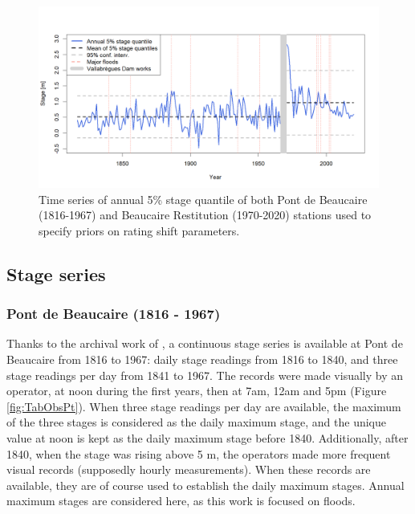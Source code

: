\documentclass[11pt]{article}
\begin{document}
    \begin{figure}[h]
        \centering
        \includegraphics[width = 15cm]{Figs/5-Quant5perc_both.png}
        \caption{Time series of annual 5\% stage quantile of both Pont de Beaucaire (1816-1967) and Beaucaire Restitution (1970-2020) stations used to specify priors on rating shift parameters.}
        \label{fig:quantile5_both}
    \end{figure}
        
    \subsection{Stage series}

    \subsubsection{Pont de Beaucaire (1816 - 1967)}
    
    Thanks to the archival work of \citet{pichard_hydro-climatology_2017}, a continuous stage series is available at Pont de Beaucaire from 1816 to 1967: daily stage readings from 1816 to 1840, and three stage readings per day from 1841 to 1967. The records were made visually by an operator, at noon during the first years, then at 7am, 12am and 5pm (Figure \ref{fig:TabObsPt}). When three stage readings per day are available, the maximum of the three stages is considered as the daily maximum stage, and the unique value at noon is kept as the daily maximum stage before 1840. Additionally, after 1840, when the stage was rising above 5 m, the operators made more frequent visual records (supposedly hourly measurements). When these records are available, they are of course used to establish the daily maximum stages. Annual maximum stages are considered here, as this work is focused on floods. 
    
\end{document}
